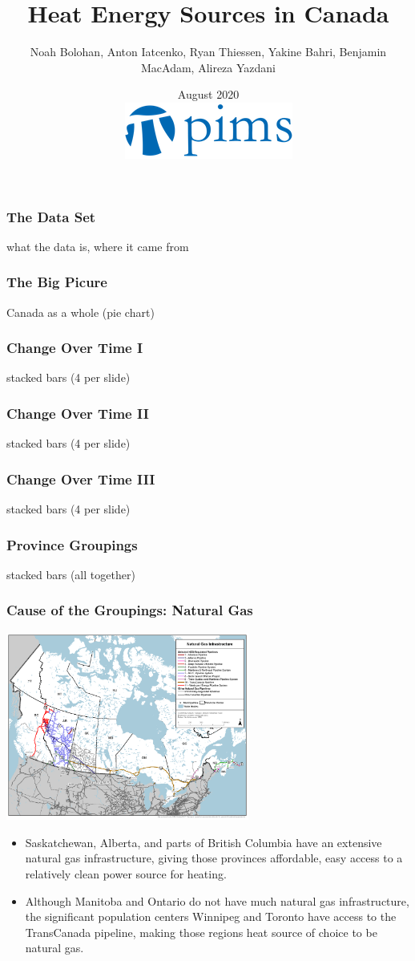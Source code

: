 \documentclass{beamer}
\title{Heat Energy Sources in Canada}
\author{Noah Bolohan, Anton Iatcenko, Ryan Thiessen, Yakine Bahri, Benjamin MacAdam, Alireza Yazdani}
\institute{Math\textsuperscript{Industry}}
\date{August 2020  \\ \vspace{30pt} \includegraphics[scale=0.3]{pims_logo.png} }
\begin{document}
\frame{\titlepage}

\begin{frame}
\frametitle{The Data Set}
what the data is, where it came from
\end{frame}


\begin{frame}
\frametitle{The Big Picure}
Canada as a whole (pie chart)
\end{frame}


\begin{frame}
\frametitle{Change Over Time I}
stacked bars (4 per slide)
\end{frame}


\begin{frame}
\frametitle{Change Over Time II}
stacked bars (4 per slide)
\end{frame}


\begin{frame}
\frametitle{Change Over Time III}
stacked bars (4 per slide)
\end{frame}


\begin{frame}
\frametitle{Province Groupings}
stacked bars (all together)
\end{frame}


\begin{frame}

\frametitle{Cause of the Groupings: Natural Gas}
\includegraphics[width=0.6\textwidth]{natural_gas_pipeline_natural_resources_canada}
\small
\begin{itemize}
	\item Saskatchewan, Alberta, and parts of British Columbia have an extensive natural gas infrastructure, giving those provinces affordable, easy access to a relatively clean power source for heating.
	\item Although Manitoba and Ontario do not have much natural gas infrastructure, the significant population centers Winnipeg and Toronto have access to the TransCanada pipeline, making those regions heat source of choice to be natural gas.
\end{itemize}
\normalsize
\end{frame}
\end{document}
